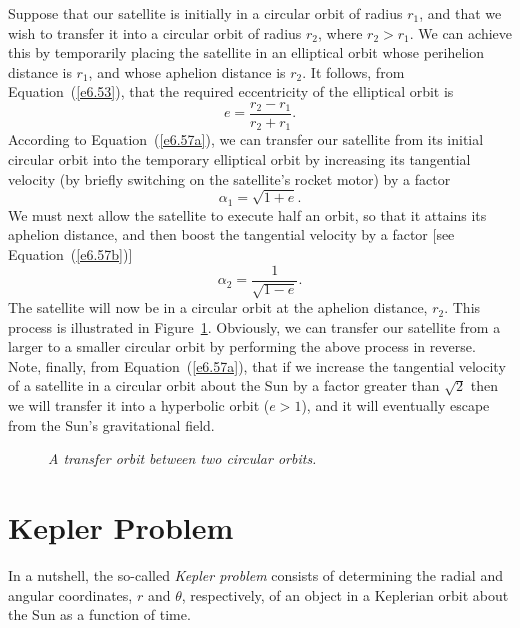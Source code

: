 Suppose that our satellite is initially in a circular orbit of radius $r_1$, and that we wish
to transfer it into a circular orbit of radius $r_2$, where $r_2> r_1$. We can
achieve this by temporarily placing the satellite in an  elliptical orbit
whose perihelion distance is $r_1$, and whose aphelion distance is $r_2$. 
It follows, from Equation~(\ref{e6.53}), that the required eccentricity of the elliptical
orbit is
\begin{equation}
e = \frac{r_2-r_1}{r_2+r_1}.
\end{equation}
According to Equation~(\ref{e6.57a}), we can transfer our satellite from its
initial circular orbit into the
temporary elliptical orbit by increasing its tangential velocity (by briefly
switching on the satellite's rocket motor) by a factor
\begin{equation}
\alpha_1 = \sqrt{1+e}.
\end{equation}
We must next allow the satellite to execute half an orbit, so that it attains its aphelion
distance, and then boost the tangential velocity by a
factor [see Equation~(\ref{e6.57b})]
\begin{equation}
\alpha_2 = \frac{1}{\sqrt{1-e}}.
\end{equation}
The satellite will now be in a circular orbit at the aphelion distance, $r_2$.
This process is illustrated in Figure~\ref{fftrans}. Obviously, we can transfer
our satellite from a larger to a smaller circular orbit by performing
the above process in reverse. Note, finally, from Equation~(\ref{e6.57a}), that if we
increase the tangential velocity of a satellite in a circular orbit about the Sun by a
factor greater than $\sqrt{2}$ then we will transfer it into a
hyperbolic orbit ($e>1$), and it will eventually escape from the Sun's
gravitational field.

\begin{figure}
\centerline{}
\caption{\em A transfer orbit between two circular orbits.}\label{fftrans}
\end{figure}

\section{Kepler Problem}
In a nutshell, the so-called {\em Kepler problem}\/ consists of determining
the radial and angular coordinates, $r$ and $\theta$, respectively, of
an object in a Keplerian orbit about the Sun as a function of time.

